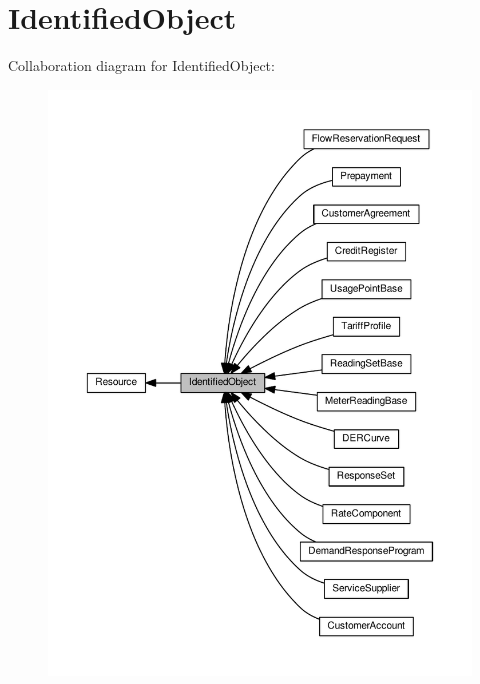 \hypertarget{group__IdentifiedObject}{}\section{Identified\+Object}
\label{group__IdentifiedObject}
Collaboration diagram for Identified\+Object\+:\nopagebreak
\begin{figure}[H]
\begin{center}
\leavevmode
\includegraphics[width=350pt]{group__IdentifiedObject}
\end{center}
\end{figure}
